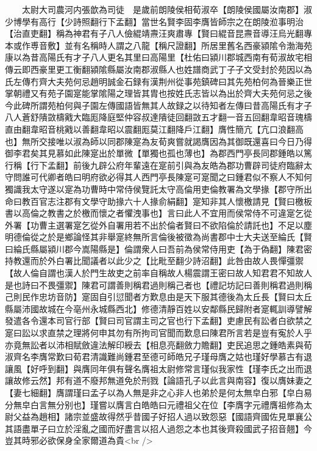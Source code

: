 　　太尉大司農河内張歆為司徒　是歲前朗陵侯相荀淑卒【朗陵侯國屬汝南郡】淑少博學有高行【少詩照翻行下孟翻】當世名賢李固李膺皆師宗之在朗陵涖事明治【治直吏翻】稱為神君有子八人儉緄靖燾汪爽肅專【賢曰緄音昆燾音導汪烏光翻專本或作尃音敷】並有名稱時人謂之八龍【稱尺證翻】所居里舊名西豪潁隂令渤海苑康以為昔高陽氏有才子八人更名其里曰高陽里【杜佑曰潁川郡城西南有荀淑故宅相傳云即西豪里更工衡翻潁隂縣屬汝南郡淑縣人也姓譜商武丁子子文受封於苑因以為氏左傳冇齊大夫苑何忌趙明誠金石録有漢荆州從事苑鎮碑曰其先苑柏何為晉樂正世掌朝禮又有苑子園寔能掌隂陽之理皆其胄也按姓氏志皆以為出於齊大夫苑何忌之後今此碑所謂苑柏何與子園左傳國語皆無其人故録之以待知者左傳曰昔高陽氏有才子八人蒼舒隤敳檮戭大臨厖降庭堅仲容叔達隤徒回翻敳五才翻一音五回翻韋昭音瑰檮直由翻韋昭音桃戭以善翻韋昭以震翻厖莫江翻降戶江翻】膺性簡亢【亢口浪翻高也】無所交接唯以淑為師以同郡陳寔為友荀爽嘗就謁膺因為其御既還喜曰今日乃得御李君矣其見慕如此陳寔出於單微【單獨也孤也薄也】為郡西門亭長同郡鍾皓以篤行稱【行下孟翻】前後九辟公府年輩遠在寔前引與為友皓為郡功曹辟司徒府臨辭太守問誰可代卿者皓曰明府欲必得其人西門亭長陳寔可寔聞之曰鍾君似不察人不知何獨識我太守遂以寔為功曹時中常侍侯覽託太守高倫用吏倫教署為文學掾【郡守所出命曰教百官志注郡有文學守助掾六十人掾俞絹翻】寔知非其人懷檄請見【賢曰檄板書以高倫之教書之於檄而懷之者懼洩事也】言曰此人不宜用而侯常侍不可違寔乞從外署【功曹主選署寔乞從外自署用若不出於倫者賢曰不欲陷倫於請託也】不足以塵明德倫從之於是鄉論怪其非舉寔終無所言倫後被徵為尚書郡中士大夫送至綸氏【賢曰綸氏縣屬潁川郡今嵩陽縣是】倫謂衆人曰吾前為侯常侍用吏【為于偽翻】陳君密持教還而於外白署比聞議者以此少之【比毗至翻少詩沼翻】此咎由故人畏憚彊禦【故人倫自謂也漢人於門生故吏之前率自稱故人楊震謂王密曰故人知君君不知故人是也詩曰不畏彊禦】陳君可謂善則稱君過則稱己者也【禮記坊記曰善則稱君過則稱己則民作忠坊音防】寔固自引愆聞者方歎息由是天下服其德後為太丘長【賢曰太丘縣屬沛國故城在今亳州永城縣西北】修德清靜百姓以安鄰縣民歸附者寔輒訓導譬解發遣各令還本司官行部【賢曰司官謂主司之官也行下孟翻】吏慮民有訟者白欲禁之寔曰訟以求直禁之理將何申其勿有所拘司官聞而歎息曰陳君所言若是豈有寃於人乎亦竟無訟者以沛相賦斂違法解印綬去【相息亮翻斂力贍翻】吏民追思之鍾皓素與荀淑齊名李膺常歎曰荀君清識難尚鍾君至德可師皓兄子瑾母膺之姑也瑾好學慕古有退讓風【好呼到翻】與膺同年俱有聲名膺祖太尉修常言瑾似我家性【瑾李氏之出而退讓故修云然】邦有道不廢邦無道免於刑戮【論語孔子以此言與南容】復以膺妹妻之【妻七細翻】膺謂瑾曰孟子以為人無是非之心非人也弟於是何太無皁白邪【皁白易分無皁白言無分别也】瑾嘗以膺言白皓皓曰元禮祖父在位【李膺字元禮膺祖修為太尉父益為趙相】諸宗並盛故得然乎昔國子好招人過以致怨惡【國語齊國佐見單襄公其語盡單子曰立於淫亂之國而好盡言以招人過怨之本也其後齊殺國武子招音翹】今豈其時邪必欲保身全家爾道為貴<br />
